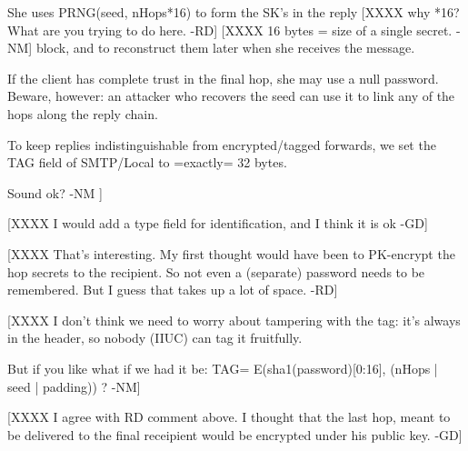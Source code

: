          She uses PRNG(seed, nHops*16) to form the SK's in the reply
[XXXX why *16? What are you trying to do here. -RD]
[XXXX 16 bytes = size of a single secret. -NM]
         block, and to reconstruct them later when she receives the 
         message.
       
         If the client has complete trust in the final hop, she may
         use a null password.  Beware, however: an attacker who recovers 
         the seed can use it to link any of the hops along the reply 
         chain.

	 To keep replies indistinguishable from encrypted/tagged
         forwards, we set the TAG field of SMTP/Local to =exactly=
         32 bytes.

         Sound ok?                                 -NM ]

[XXXX I would add a type field for identification, and I think it is
ok -GD]

[XXXX That's interesting. My first thought would have been to PK-encrypt
      the hop secrets to the recipient. So not even a (separate) password
      needs to be remembered. But I guess that takes up a lot of
      space. -RD]

[XXXX I don't think we need to worry about tampering with the tag:
      it's always in the header, so nobody (IIUC) can tag it fruitfully.

      But if you like what if we had it be:
        TAG= E(sha1(password)[0:16],  (nHops | seed | padding)) ? -NM]

[XXXX I agree with RD comment above.  I thought that the last hop, meant
 to be delivered to the final receipient would be encrypted under his public 
 key. -GD]

